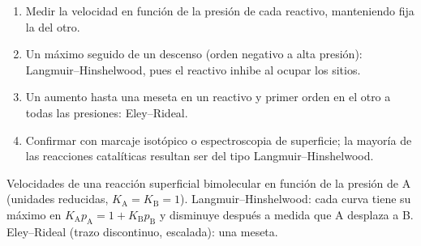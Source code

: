 \begin{method}\label{met:b3:surfaces-catalysis:mechanism-from-rate}
\begin{enumerate}
  \item Medir la velocidad en función de la presión de cada reactivo, manteniendo fija la
        del otro.
  \item Un máximo seguido de un descenso (orden negativo a alta presión):
        Langmuir--Hinshelwood, pues el reactivo inhibe al ocupar los sitios.
  \item Un aumento hasta una meseta en un reactivo y primer orden en el otro a todas las
        presiones: Eley--Rideal.
  \item Confirmar con marcaje isotópico o espectroscopia de superficie; la mayoría de las reacciones
        catalíticas resultan ser del tipo Langmuir--Hinshelwood.
\end{enumerate}
\end{method}

\begin{omfigure}

{\small Velocidades de una reacción superficial bimolecular en función de la presión de A
(unidades reducidas, $K_{\mathrm A} = K_{\mathrm B} = 1$). Langmuir--Hinshelwood: cada curva tiene su máximo en $K_{\mathrm A}p_{\mathrm A} =
1 + K_{\mathrm B}p_{\mathrm B}$ y disminuye después a medida que A desplaza a B. Eley--Rideal (trazo discontinuo, escalada): una meseta.}
\end{omfigure}

